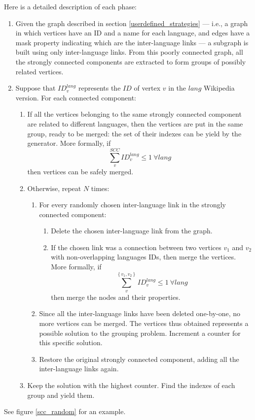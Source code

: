                 Here is a detailed description of each phase:
                \begin{enumerate}
                    \item Given the graph described in section \ref{userdefined_strategies} --- i.e., a graph in which vertices have an ID and a name for each language, and edges have a mask property indicating which are the inter-language links --- a subgraph is built using only inter-language links. From this poorly connected graph, all the strongly connected components are extracted to form groups of possibly related vertices.
                    \item Suppose that \(ID_v^{lang}\) represents the \(ID\) of vertex \(v\) in the \(lang\) Wikipedia version. For each connected component:
                    \begin{enumerate}
                        \item If all the vertices belonging to the same strongly connected component are related to different languages, then the vertices are put in the same group, ready to be merged: the set of their indexes can be yield by the generator. More formally, if
                        \[\sum_{v}^{SCC}ID_v^{lang} \le 1\ \forall lang\]
                        then vertices can be safely merged.
                        \item Otherwise, repeat \(N\) times:
                        \begin{enumerate}
                            \item For every randomly chosen inter-language link in the strongly connected component:
                            \begin{enumerate}
                                \item Delete the chosen inter-language link from the graph.
                                \item If the chosen link was a connection between two vertices \(v_1\) and \(v_2\) with non-overlapping languages IDs, then merge the vertices. More formally, if
                                \[\sum_{v}^{\left\{v_1,v_2\right\}}ID_v^{lang} \le 1\ \forall lang\]
                                then merge the nodes and their properties.
                            \end{enumerate}
                            \item Since all the inter-language links have been deleted one-by-one, no more vertices can be merged. The vertices thus obtained represents a possible solution to the grouping problem. Increment a counter for this specific solution.
                            \item Restore the original strongly connected component, adding all the inter-language links again.
                        \end{enumerate}
                        \item Keep the solution with the highest counter. Find the indexes of each group and yield them.
                    \end{enumerate}
                \end{enumerate}
                See figure \ref{scc_random} for an example.
                
